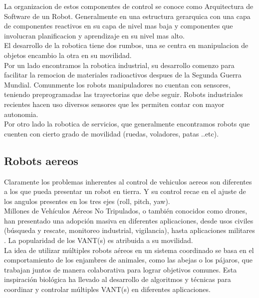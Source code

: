 \documentclass[11pt,epsf,times]{article}
\begin{document}
  La organizacion de estos componentes de control se conoce como Arquitectura de Software de un Robot. Generalmente en una estructura gerarquica con una capa de componentes reactivos en su capa de nivel mas baja y componentes que involucran planificacion y aprendizaje en su nivel mas alto.\\
  
  El desarrollo de la robotica tiene dos rumbos, una se centra en manipulacion de objetos encambio la otra en su movilidad.\\
  
  Por un lado encontramos la robotica industrial, su desarrollo comenzo para facilitar la remocion de materiales radioactivos despues de la Segunda Guerra Mundial. Comunmente los robots manipuladores no cuentan con sensores, teniendo preprogramadas las trayectorias que debe seguir. Robots industriales recientes hacen uso diversos sensores que les permiten contar con mayor autonomia.\\
  Por otro lado la robotica de servicios, que generalmente encontramos robots que cuenten con cierto grado de movilidad (ruedas, voladores, patas ..etc).
  
\subsection*{Robots aereos}
  
  Claramente los problemas inherentes al control de vehiculos aereos son diferentes a los que pueda presentar un robot en tierra. Y su control recae en el ajuste de los angulos presentes en los tres ejes (roll, pitch, yaw).\\
  
  Millones de Veh\'{i}culos A\'{e}reos No Tripulados, o tambi\'{e}n conocidos como drones, han presentado una adopci\'{o}n masiva en diferentes aplicaciones, desde usos civiles (b\'{u}squeda y rescate, monitoreo industrial, vigilancia), hasta aplicaciones militares \cite{UAVCIVIL2019}. La popularidad de los VANT(s) es atribuida a su movilidad.\\

La idea de utilizar m\'{u}ltiples robots a\'{e}reos en un sistema coordinado se basa en el comportamiento de los enjambres de animales, como las abejas o los p\'{a}jaros, que trabajan juntos de manera colaborativa para lograr objetivos comunes. Esta inspiraci\'{o}n biol\'{o}gica ha llevado al desarrollo de algoritmos y t\'{e}cnicas para coordinar y controlar m\'{u}ltiples VANT(s) en diferentes aplicaciones.\\
  
\end{document}
